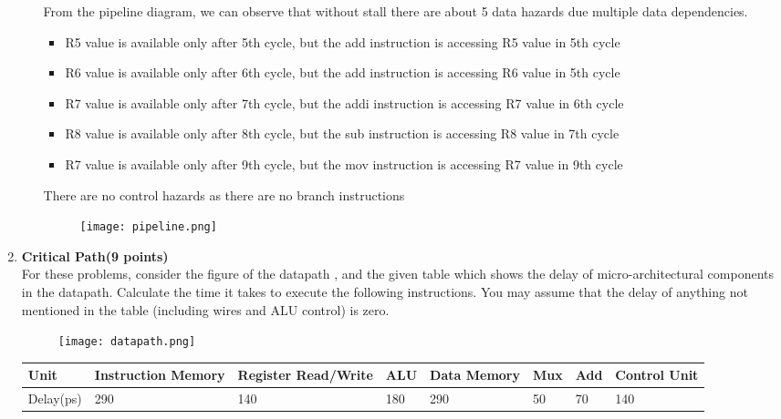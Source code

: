 \documentclass[a4paper,10pt]{article}
\begin{document}
\begin{enumerate}
\begin{enumerate}
    From the pipeline diagram, we can observe that without stall there are about 5 data hazards due multiple data dependencies.\\
    \begin{itemize}
        \item R5 value is available only after 5th cycle, but the add instruction is accessing R5 value in 5th cycle
        \item R6 value is available only after 6th cycle, but the add instruction is accessing R6 value in 5th cycle
        \item R7 value is available only after 7th cycle, but the addi instruction is accessing R7 value in 6th cycle
        \item R8 value is available only after 8th cycle, but the sub instruction is accessing R8 value in 7th cycle
        \item R7 value is available only after 9th cycle, but the mov instruction is accessing R7 value in 9th cycle
    \end{itemize}
    There are no control hazards as there are no branch instructions\\
    
     \begin{figure}[!h]
        \centering
        \texttt{[image: pipeline.png]}
    \end{figure}
  \end{enumerate}
    \item \textbf{Critical Path(9 points)}\\
  For these problems, consider the figure of the datapath , and the given table which shows the delay of micro-architectural components in the datapath. Calculate the time it takes to execute the following instructions. You may assume that the delay of anything not mentioned in the table (including wires and ALU control) is zero. 
  \begin{figure}[!h]
        \centering
        \texttt{[image: datapath.png]}
    \end{figure}
    \begin{center}
    \begin{table}[h]
    \centering
\begin{tabular}{ |l|l|l|l|l|l|l|l|}
\hline
Unit &	Instruction Memory & Register Read/Write & ALU & Data Memory & Mux & Add & Control Unit \\ \hline
Delay(ps) & 290 & 140 & 180 & 290 & 50 & 70 & 140    \\ \hline


\end{tabular}
\end{table}
\end{center}
\end{enumerate}
\end{document}
